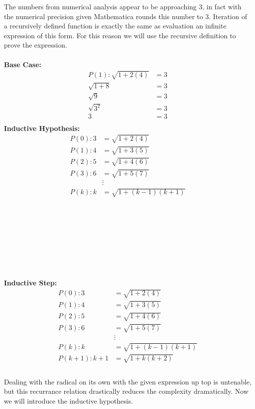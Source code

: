 \documentclass[12pt]{article}
\begin{document}
The numbers from numerical analysis appear to be approaching 3, in fact with the numerical precision given Mathematica rounds this number to 3. Iteration of a recursively defined function is exactly the same as evaluation an infinite expression of this form. For this reason we will use the recursive definition to prove the expression. \\\\
\textbf{Base Case:}\\
\begin{align*}
P(1):\sqrt{1+2(4)} &= 3\\
\sqrt{1+8} &= 3\\
\sqrt{9} &= 3\\
\sqrt{3^2} &= 3\\
3 &= 3\\
\end{align*}
\textbf{Inductive Hypothesis:}\\
\begin{align*}
P(0):3 &= \sqrt{1+2(4)}\\
P(1):4 &= \sqrt{1+3(5)}\\
P(2):5 &= \sqrt{1+4(6)}\\
P(3):6 &= \sqrt{1+5(7)}\\
&\vdots\\
P(k):k &= \sqrt{1+(k-1)(k+1)}\\
\end{align*}\\\\\\\\\\\\\\\\
\textbf{Inductive Step:}\\
\begin{align*}
P(0):3 &= \sqrt{1+2(4)}\\
P(1):4 &= \sqrt{1+3(5)}\\
P(2):5 &= \sqrt{1+4(6)}\\
P(3):6 &= \sqrt{1+5(7)}\\
&\vdots\\
P(k):k &= \sqrt{1+(k-1)(k+1)}\\
P(k + 1):k + 1 &= \sqrt{1+k(k+2)}\\
\end{align*}\\
Dealing with the radical on its own with the given expression up top is untenable, but this recurrance relation drastically reduces the complexity dramatically. Now we will introduce the inductive hypothesis.\\
\end{document}
